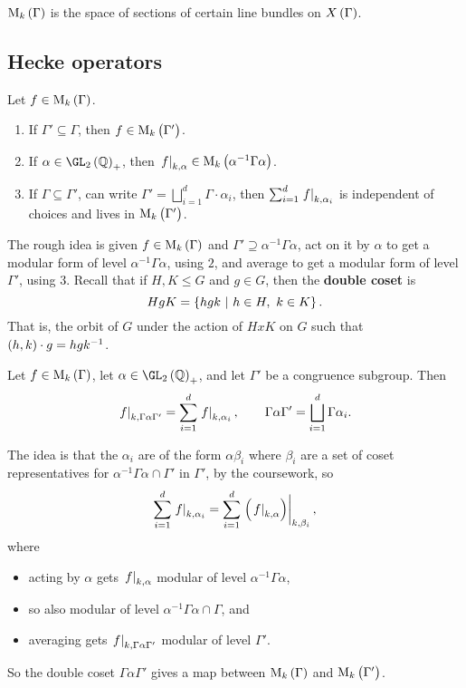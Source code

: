 $ \M_k\br{\Gamma} $ is the space of sections of certain line bundles on $ X\br{\Gamma} $.

\pagebreak

\subsection{Hecke operators}


Let $ f \in \M_k\br{\Gamma} $.
\begin{enumerate}
\item If $ \Gamma' \subseteq \Gamma $, then $ f \in \M_k\br{\Gamma'} $.
\item If $ \alpha \in \GL_2\br{\QQ}_+ $, then $ \eval{f}_{k, \alpha} \in \M_k\br{\alpha^{-1}\Gamma\alpha} $.
\item If $ \Gamma \subseteq \Gamma' $, can write $ \Gamma' = \bigsqcup_{i = 1}^d \Gamma \cdot \alpha_i $, then $ \sum_{i = 1}^d \left. f \right|_{k, \alpha_i} $ is independent of choices and lives in $ \M_k\br{\Gamma'} $.
\end{enumerate}
The rough idea is given $ f \in \M_k\br{\Gamma} $ and $ \Gamma' \supseteq \alpha^{-1}\Gamma\alpha $, act on it by $ \alpha $ to get a modular form of level $ \alpha^{-1}\Gamma\alpha $, using $ 2 $, and average to get a modular form of level $ \Gamma' $, using $ 3 $. Recall that if $ H, K \le G $ and $ g \in G $, then the \textbf{double coset} is
$$ HgK = \cbr{hgk \st h \in H, \ k \in K}. $$
That is, the orbit of $ G $ under the action of $ HxK $ on $ G $ such that $ \br{h, k} \cdot g = hgk^{-1} $.

\begin{definition}
Let $ f \in \M_k\br{\Gamma} $, let $ \alpha \in \GL_2\br{\QQ}_+ $, and let $ \Gamma' $ be a congruence subgroup. Then
$$ \left. f \right|_{k, \Gamma\alpha\Gamma'} = \sum_{i = 1}^d \left. f \right|_{k, \alpha_i}, \qquad \Gamma\alpha\Gamma' = \bigsqcup_{i = 1}^d \Gamma\alpha_i. $$
\end{definition}

The idea is that the $ \alpha_i $ are of the form $ \alpha\beta_i $ where $ \beta_i $ are a set of coset representatives for $ \alpha^{-1}\Gamma\alpha \cap \Gamma' $ in $ \Gamma' $, by the coursework, so
$$ \sum_{i = 1}^d \eval{f}_{k, \alpha_i} = \sum_{i = 1}^d \eval{\br{\eval{f}_{k, \alpha}}}_{k, \beta_i}, $$
where
\begin{itemize}
\item acting by $ \alpha $ gets $ \left. f \right|_{k, \alpha} $ modular of level $ \alpha^{-1}\Gamma\alpha $,
\item so also modular of level $ \alpha^{-1}\Gamma\alpha \cap \Gamma $, and
\item averaging gets $ \left. f \right|_{k, \Gamma\alpha\Gamma'} $ modular of level $ \Gamma' $.
\end{itemize}
So the double coset $ \Gamma\alpha\Gamma' $ gives a map between $ \M_k\br{\Gamma} $ and $ \M_k\br{\Gamma'} $.

